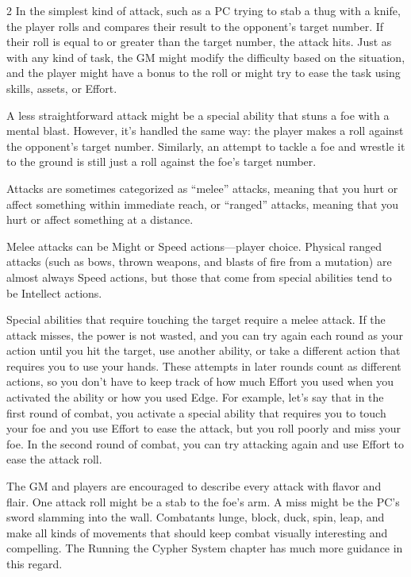 \begin{multicols}{2}
In the simplest kind of attack, such as a PC trying to stab a thug with a knife, the player rolls and compares their result to the opponent’s target number. If their roll is equal to or greater than the target number, the attack hits. Just as with any kind of task, the GM might modify the difficulty based on the situation, and the player might have a bonus to the roll or might try to ease the task using skills, assets, or Effort.

A less straightforward attack might be a special ability that stuns a foe with a mental blast. However, it’s handled the same way: the player makes a roll against the opponent’s target number. Similarly, an attempt to tackle a foe and wrestle it to the ground is still just a roll against the foe’s target number.

Attacks are sometimes categorized as “melee” attacks, meaning that you hurt or affect something within immediate reach, or “ranged” attacks, meaning that you hurt or affect something at a distance.

Melee attacks can be Might or Speed actions—player choice. Physical ranged attacks (such as bows, thrown weapons, and blasts of fire from a mutation) are almost always Speed actions, but those that come from special abilities tend to be Intellect actions.

Special abilities that require touching the target require a melee attack. If the attack misses, the power is not wasted, and you can try again each round as your action until you hit the target, use another ability, or take a different action that requires you to use your hands. These attempts in later rounds count as different actions, so you don’t have to keep track of how much Effort you used when you activated the ability or how you used Edge. For example, let’s say that in the first round of combat, you activate a special ability that requires you to touch your foe and you use Effort to ease the attack, but you roll poorly and miss your foe. In the second round of combat, you can try attacking again and use Effort to ease the attack roll.

The GM and players are encouraged to describe every attack with flavor and flair. One attack roll might be a stab to the foe’s arm. A miss might be the PC’s sword slamming into the wall. Combatants lunge, block, duck, spin, leap, and make all kinds of movements that should keep combat visually interesting and compelling. The Running the Cypher System chapter has much more guidance in this regard.


\end{multicols}
